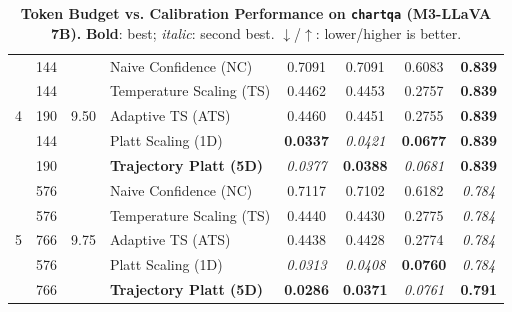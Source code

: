 \begin{table}[t]
\begin{tabular}{ccclcccc}
\midrule
\multirow{5}{*}{4} & 144 & \multirow{5}{*}{9.50} & Naive Confidence (NC) & 0.7091 & 0.7091 & 0.6083 & \textbf{0.839} \\
 & 144 &  & Temperature Scaling (TS) & 0.4462 & 0.4453 & 0.2757 & \textbf{0.839} \\
 & 190 &  & Adaptive TS (ATS) & 0.4460 & 0.4451 & 0.2755 & \textbf{0.839} \\
 & 144 &  & Platt Scaling (1D) & \textbf{0.0337} & \textit{0.0421} & \textbf{0.0677} & \textbf{0.839} \\
 & 190 &  & \textbf{Trajectory Platt (5D)} & \textit{0.0377} & \textbf{0.0388} & \textit{0.0681} & \textbf{0.839} \\
\midrule
\multirow{5}{*}{5} & 576 & \multirow{5}{*}{9.75} & Naive Confidence (NC) & 0.7117 & 0.7102 & 0.6182 & \textit{0.784} \\
 & 576 &  & Temperature Scaling (TS) & 0.4440 & 0.4430 & 0.2775 & \textit{0.784} \\
 & 766 &  & Adaptive TS (ATS) & 0.4438 & 0.4428 & 0.2774 & \textit{0.784} \\
 & 576 &  & Platt Scaling (1D) & \textit{0.0313} & \textit{0.0408} & \textbf{0.0760} & \textit{0.784} \\
 & 766 &  & \textbf{Trajectory Platt (5D)} & \textbf{0.0286} & \textbf{0.0371} & \textit{0.0761} & \textbf{0.791} \\
\bottomrule
\end{tabular}
\caption{\textbf{Token Budget vs. Calibration Performance on \texttt{chartqa} (M3-LLaVA 7B).} \textbf{Bold}: best; \textit{italic}: second best. $\downarrow$/$\uparrow$: lower/higher is better.}
\label{tab:token_budget_chartqa_m3}
\end{table}

